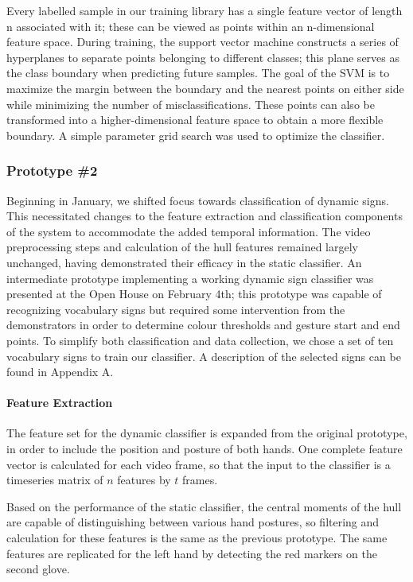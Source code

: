 \documentclass[12pt]{article}
\begin{document}
Every labelled sample in our training library has a single feature vector of length n associated with it; these can be viewed as points within an n-dimensional feature space. During training, the support vector machine constructs a series of hyperplanes to separate points belonging to different classes; this plane serves as the class boundary when predicting future samples. The goal of the SVM is to maximize the margin between the boundary and the nearest points on either side while minimizing the number of misclassifications. These points can also be transformed into a higher-dimensional feature space to obtain a more flexible boundary. A simple parameter grid search was used to optimize the classifier.

\subsubsection{Prototype \#2}
Beginning in January, we shifted focus towards classification of dynamic signs. This necessitated changes to the feature extraction and classification components of the system to accommodate the added temporal information. The video preprocessing steps and calculation of the hull features remained largely unchanged, having demonstrated their efficacy in the static classifier. An intermediate prototype implementing a working dynamic sign classifier was presented at the Open House on February 4th; this prototype was capable of recognizing  vocabulary signs but required some intervention from the demonstrators in order to determine colour thresholds and gesture start and end points. To simplify both classification and data collection, we chose a set of ten vocabulary signs to train our classifier. A description of the selected signs can be found in Appendix A.  

\paragraph{Feature Extraction}
The feature set for the dynamic classifier is expanded from the original prototype, in order to include the position and posture of both hands. One complete feature vector is calculated for each video frame, so that the input to the classifier is a timeseries matrix of \(n\) features by \(t\) frames.

Based on the performance of the static classifier, the central moments of the hull are capable of distinguishing between various hand postures, so filtering and calculation for these features is the same as the previous prototype. The same features are replicated for the left hand by detecting the red markers on the second glove. 
\end{document}
